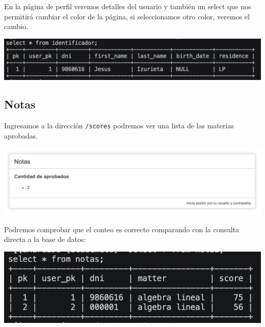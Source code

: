 \documentclass[letter]{article}
\begin{document}
En la página de perfil veremos detalles del usuario y también un select que nos
permitirá cambiar el color de la página, si seleccionamos otro color, veremos el
cambio.

\begin{center}
\includegraphics[width=.9\linewidth]{./img/iden.png}
\end{center}

\subsection{Notas}
\label{sec:orgf1bb77f}
Ingresamos a la dirección \texttt{/scores} podremos ver una lista de las materias aprobadas.

\begin{center}
\includegraphics[width=.9\linewidth]{./img/score.png}
\end{center}

Podremos comprobar que el conteo es correcto comparando con la consulta directa
a la base de datos:

\begin{center}
\includegraphics[width=.9\linewidth]{./img/scoredb.png}
\end{center}
\end{document}
